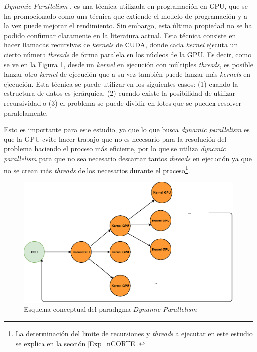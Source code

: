 \documentclass[10pt, conference, compsocconf, onecolumn]{IEEEtran}
\begin{document}
\textit{Dynamic Parallelism} \cite{DinamicParallelism} \cite{TriMap2013}, es una t\'ecnica utilizada en programaci\'on en GPU, que se ha promocionado como una t\'ecnica que extiende el modelo de programaci\'on y a la vez puede mejorar el rendimiento. Sin embargo, esta \'ultima propiedad no se ha podido confirmar claramente en la literatura actual. Esta t\'ecnica consiste en hacer llamadas recursivas de \textit{kernels} de CUDA, donde cada \textit{kernel} ejecuta un cierto n\'umero \textit{threads} de forma paralela en los n\'ucleos de la GPU. Es decir, como se ve en la Figura \ref{fig_Parelismodinamico}, desde un \textit{kernel} en ejecuci\'on con m\'ultiples \textit{threads}, es posible lanzar otro \textit{kernel} de ejecuci\'on que a su vez tambi\'en puede lanzar m\'as \textit{kernels} en ejecuci\'on. Esta t\'ecnica se puede utilizar en los siguientes casos: (1) cuando la estructura de datos es jer\'arquica, (2) cuando existe la posibilidad de utilizar recursividad o (3) el problema se puede dividir en lotes que se pueden resolver paralelamente.

 
 Esto es importante para este estudio, ya que lo que busca \textit{dynamic parallelism} es que la GPU evite hacer trabajo que no es necesario para la resoluci\'on del problema haciendo el proceso m\'as eficiente, por lo que se utiliza \textit{dynamic parallelism} para que no sea necesario descartar tantos\textit{ threads} en ejecuci\'on ya que no se crean m\'as \textit{threads} de los necesarios durante el proceso\footnote{La determinaci\'on del limite de recursiones y \textit{threads} a ejecutar en este estudio se explica en la secci\'on \ref{Exp_nCORTE}. }.
 \begin{figure}[H]
 	\centering
 	\includegraphics[scale=0.70]{figures/paralelismo_dinamico.eps}
 	\caption{Esquema conceptual del paradigma \textit{Dynamic Parallelism}}
 	\label{fig_Parelismodinamico}
 \end{figure}
 
\end{document}
